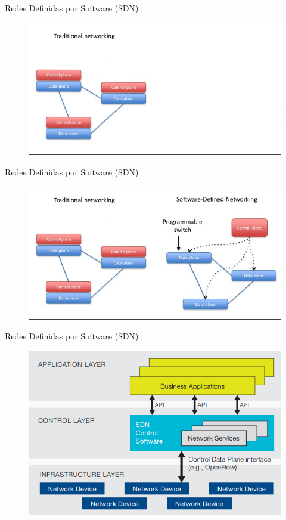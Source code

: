 \documentclass[xcolor=svgnames]{beamer}
\begin{document}
\begin{frame}{Redes Definidas por Software (SDN)}
	\begin{figure}[t]
		\includegraphics[scale=0.6]{sdn_transicion1}
	\end{figure}
\end{frame}

\begin{frame}{Redes Definidas por Software (SDN)}
	\begin{figure}[t]
		\includegraphics[scale=0.6]{sdn_transicion}
	\end{figure}
\end{frame}

\begin{frame}{Redes Definidas por Software (SDN)}
	\begin{figure}[t]
		\includegraphics[scale=0.6]{arquitectura_sdn}
	\end{figure}
\end{frame}
\end{document}
